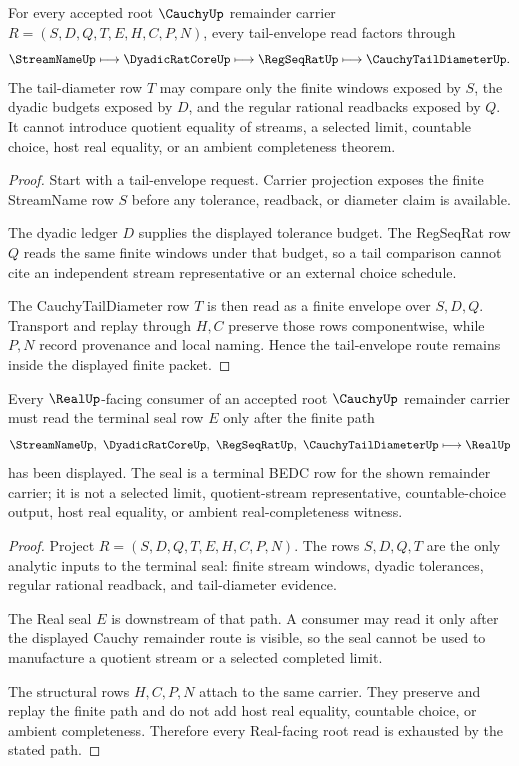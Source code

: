 \begin{theorem}
\label{thm:cauchy-tail-envelope-root-obligations}
For every accepted root $\CauchyUp$ remainder carrier $R=(S,D,Q,T,E,H,C,P,N)$, every tail-envelope read factors through
$$
\StreamNameUp \longmapsto \DyadicRatCoreUp \longmapsto \RegSeqRatUp \longmapsto \CauchyTailDiameterUp .
$$
The tail-diameter row $T$ may compare only the finite windows exposed by $S$, the dyadic budgets exposed by $D$, and the regular rational readbacks exposed by $Q$. It cannot introduce quotient equality of streams, a selected limit, countable choice, host real equality, or an ambient completeness theorem.
\end{theorem}
\begin{proof}
Start with a tail-envelope request. Carrier projection exposes the finite StreamName row $S$ before any tolerance, readback, or diameter claim is available.

The dyadic ledger $D$ supplies the displayed tolerance budget. The RegSeqRat row $Q$ reads the same finite windows under that budget, so a tail comparison cannot cite an independent stream representative or an external choice schedule.

The CauchyTailDiameter row $T$ is then read as a finite envelope over $S,D,Q$. Transport and replay through $H,C$ preserve those rows componentwise, while $P,N$ record provenance and local naming. Hence the tail-envelope route remains inside the displayed finite packet.
\end{proof}

\begin{theorem}
\label{thm:cauchy-real-seal-root-obligations}
Every $\RealUp$-facing consumer of an accepted root $\CauchyUp$ remainder carrier must read the terminal seal row $E$ only after the finite path
$$
\StreamNameUp,\ \DyadicRatCoreUp,\ \RegSeqRatUp,\ \CauchyTailDiameterUp
\longmapsto
\RealUp
$$
has been displayed. The seal is a terminal BEDC row for the shown remainder carrier; it is not a selected limit, quotient-stream representative, countable-choice output, host real equality, or ambient real-completeness witness.
\end{theorem}
\begin{proof}
Project $R=(S,D,Q,T,E,H,C,P,N)$. The rows $S,D,Q,T$ are the only analytic inputs to the terminal seal: finite stream windows, dyadic tolerances, regular rational readback, and tail-diameter evidence.

The Real seal $E$ is downstream of that path. A consumer may read it only after the displayed Cauchy remainder route is visible, so the seal cannot be used to manufacture a quotient stream or a selected completed limit.

The structural rows $H,C,P,N$ attach to the same carrier. They preserve and replay the finite path and do not add host real equality, countable choice, or ambient completeness. Therefore every Real-facing root read is exhausted by the stated path.
\end{proof}
